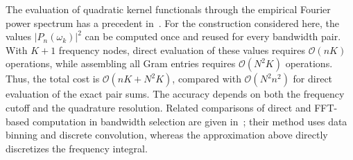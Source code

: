 
The evaluation of quadratic kernel functionals through the empirical Fourier
power spectrum has a precedent in~\cite[Section~3.5, especially
Equations~(3.51), (3.56) and~(3.61)]{silverman_density_1986}.
For the construction considered here, the values $|P_n(\omega_k)|^2$ can be
computed once and reused for every bandwidth pair. With $K+1$ frequency
nodes, direct evaluation of these values requires $\mathcal{O}(nK)$
operations, while assembling all Gram entries requires
$\mathcal{O}(N^2K)$ operations. Thus, the total cost is
$\mathcal{O}(nK+N^2K)$, compared with $\mathcal{O}(N^2n^2)$ for direct
evaluation of the exact pair sums. The accuracy depends on both the
frequency cutoff and the quadrature resolution. Related comparisons of
direct and FFT-based computation in bandwidth selection are given
in~\cite[Sections~4--6]{gramacki_fft_2017}; their method uses data binning
and discrete convolution, whereas the approximation above directly
discretizes the frequency integral.
